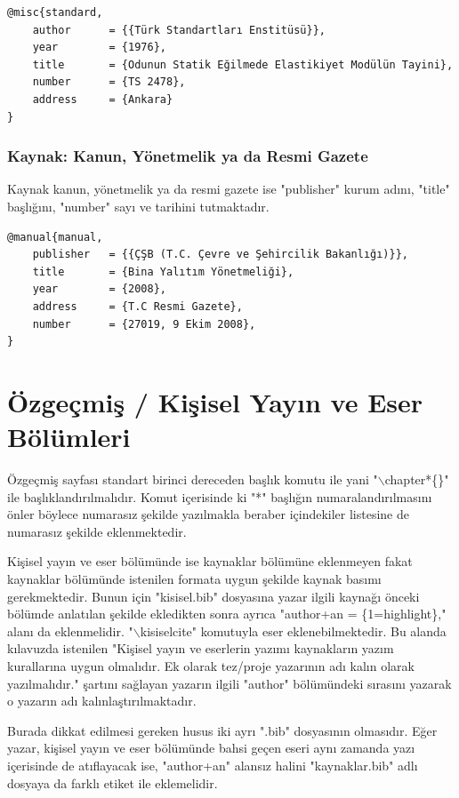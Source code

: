 \begin{lstlisting}[language={[LaTeX]{TeX}}, label=bib:standart, caption=Kaynak standart ise]
@misc{standard,
	author		= {{Türk Standartları Enstitüsü}},
	year		= {1976},
	title		= {Odunun Statik Eğilmede Elastikiyet Modülün Tayini},
	number 		= {TS 2478},
	address     = {Ankara}
}
\end{lstlisting}

\subsection{Kaynak: Kanun, Yönetmelik ya da Resmi Gazete}

Kaynak kanun, yönetmelik ya da resmi gazete ise "publisher" kurum adını, "title" başlığını, "number" sayı ve tarihini tutmaktadır.

\begin{lstlisting}[language={[LaTeX]{TeX}}, label=bib:kanun, caption={Kaynak kanun, yönetmelik ya da resmi gazete ise}]
@manual{manual,
	publisher   = {{ÇŞB (T.C. Çevre ve Şehircilik Bakanlığı)}},
	title 		= {Bina Yalıtım Yönetmeliği},
	year		= {2008},
	address		= {T.C Resmi Gazete},
	number		= {27019, 9 Ekim 2008},	
}
\end{lstlisting}


\chapter{Özgeçmiş / Kişisel Yayın ve Eser Bölümleri }
\label{ch:ozgec}
Özgeçmiş sayfası standart birinci dereceden başlık komutu ile yani "$\backslash$chapter*\{\}" ile başlıklandırılmalıdır. Komut içerisinde ki "*" başlığın numaralandırılmasını önler böylece numarasız şekilde yazılmakla beraber içindekiler listesine de numarasız şekilde eklenmektedir.

Kişisel yayın ve eser bölümünde ise kaynaklar bölümüne eklenmeyen fakat kaynaklar bölümünde istenilen formata uygun şekilde kaynak basımı gerekmektedir. Bunun için "kisisel.bib" dosyasına yazar ilgili kaynağı önceki bölümde anlatılan şekilde ekledikten sonra ayrıca "author+an = \{1=highlight\}," alanı da eklenmelidir. "$\backslash$kisiselcite{}" komutuyla eser eklenebilmektedir. Bu alanda kılavuzda istenilen "Kişisel yayın ve eserlerin yazımı kaynakların yazım kurallarına uygun olmalıdır. Ek olarak tez/proje yazarının adı kalın olarak yazılmalıdır." şartını sağlayan yazarın ilgili "author" bölümündeki sırasını yazarak o yazarın adı kalınlaştırılmaktadır.

Burada dikkat edilmesi gereken husus iki ayrı ".bib" dosyasının olmasıdır. Eğer yazar, kişisel yayın ve eser bölümünde bahsi geçen eseri aynı zamanda yazı içerisinde de atıflayacak ise, "author+an" alansız halini "kaynaklar.bib" adlı dosyaya da farklı etiket ile eklemelidir.


